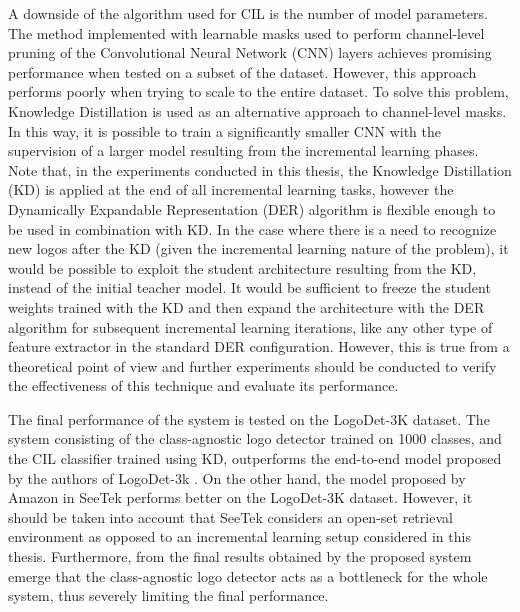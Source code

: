 A downside of the algorithm used for CIL is the number of model parameters.
The method implemented with learnable masks used to perform channel-level pruning of the Convolutional Neural Network (CNN) layers achieves promising performance when tested on a subset of the dataset.
However, this approach performs poorly when trying to scale to the entire dataset.
To solve this problem, Knowledge Distillation is used as an alternative approach to channel-level masks.
In this way, it is possible to train a significantly smaller CNN with the supervision of a larger model resulting from the incremental learning phases.
Note that, in the experiments conducted in this thesis, the Knowledge Distillation (KD) is applied at the end of all incremental learning tasks, however the Dynamically Expandable Representation (DER) algorithm \cite{yan2021dynamically} is flexible enough to be used in combination with KD.
In the case where there is a need to recognize new logos after the KD (given the incremental learning nature of the problem), it would be possible to exploit the student architecture resulting from the KD, instead of the initial teacher model.
It would be sufficient to freeze the student weights trained with the KD and then expand the architecture with the DER algorithm for subsequent incremental learning iterations, like any other type of feature extractor in the standard DER configuration.
However, this is true from a theoretical point of view and further experiments should be conducted to verify the effectiveness of this technique and evaluate its performance.

The final performance of the system is tested on the LogoDet-3K dataset.
The system consisting of the class-agnostic logo detector trained on 1000 classes, and the CIL classifier trained using KD, outperforms the end-to-end model proposed by the authors of LogoDet-3k \cite{wang2022logodet}.
On the other hand, the model proposed by Amazon in SeeTek \cite{li2022seetek} performs better on the LogoDet-3K dataset. However, it should be taken into account that SeeTek considers an open-set retrieval environment as opposed to an incremental learning setup considered in this thesis.
Furthermore, from the final results obtained by the proposed system emerge that the class-agnostic logo detector acts as a bottleneck for the whole system, thus severely limiting the final performance.

